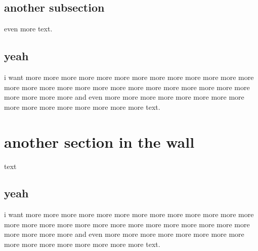 \documentclass[a4paper,10pt]{article}
\begin{document}
\subsection*{another subsection}
even more text.

\subsection*{yeah}
i want more more more more more more more more more more more more more more
more more more more more more more more more more more more more more more more
more and even more more more more more more more more more more more more more
more more more text.




\section*{another section in the wall}
text

\subsection*{yeah}
i want more more more more more more more more more more more more more more
more more more more more more more more more more more more more more more more
more and even more more more more more more more more more more more more more
more more more text.
\end{document}
